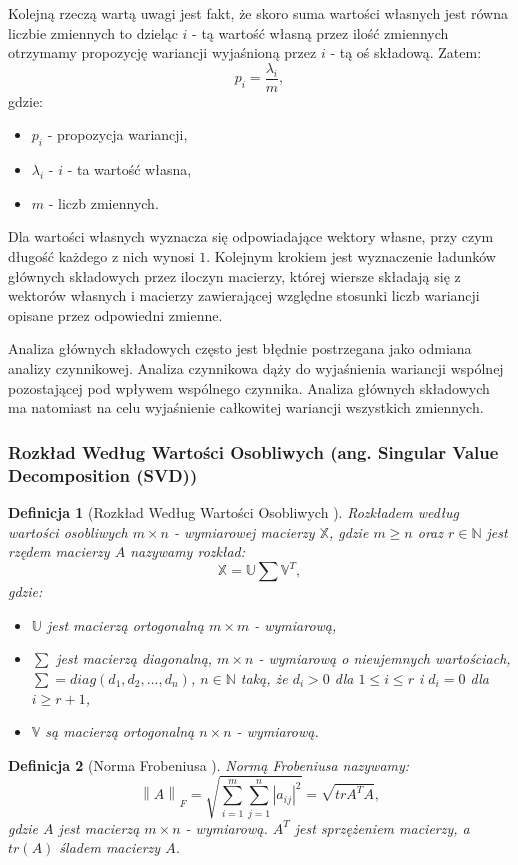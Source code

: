 \documentclass[12pt,a4paper]{report}
\newtheorem{df}{Definicja}[chapter]
\newcommand{\setN}{\mathbb{N}}
\newcommand{\norm}[2][]{\left\| {#2} \right\|_{#1}}
\begin{document}
Kolejną rzeczą wartą uwagi jest fakt, że skoro suma wartości własnych jest równa liczbie zmiennych to dzieląc $i$ - tą wartość własną przez ilość zmiennych otrzymamy propozycję wariancji wyjaśnioną przez $i$ - tą oś składową. Zatem:
$$
p_i = \frac{\lambda_i}{m},
$$
gdzie:
\begin{itemize}
\item $p_i$ - propozycja wariancji,
\item $\lambda_i$ - $i$ - ta wartość własna,
\item $m$ - liczb zmiennych.
\end{itemize}

Dla wartości własnych wyznacza się odpowiadające wektory własne, przy czym długość każdego z nich wynosi $1$. Kolejnym krokiem jest wyznaczenie ładunków głównych składowych przez iloczyn macierzy, której wiersze składają się z wektorów własnych i macierzy zawierającej względne stosunki liczb wariancji opisane przez odpowiedni zmienne.

Analiza głównych składowych często jest błędnie postrzegana jako odmiana analizy czynnikowej. Analiza czynnikowa dąży do wyjaśnienia wariancji wspólnej pozostającej pod wpływem wspólnego czynnika. Analiza głównych składowych ma natomiast na celu wyjaśnienie całkowitej wariancji wszystkich zmiennych.

\subsubsection{Rozkład Według Wartości Osobliwych (ang. Singular Value Decomposition (SVD))} 
\begin{df} [Rozkład Według Wartości Osobliwych {\citep{ulafiir}}]%
Rozkładem według wartości osobliwych $m\times n$ - wymiarowej macierzy $\mathbb{X}$, gdzie $m\geq n$ oraz $r \in \setN$ jest rzędem macierzy $A$ nazywamy rozkład:
$$
\mathbb{X}=\mathbb{U}\sum \mathbb{V}^T,
$$
gdzie:
\begin{itemize}
\item $\mathbb{U}$ jest macierzą ortogonalną $m \times m$ - wymiarową,
\item $\sum $ jest macierzą diagonalną, $m \times n$ - wymiarową o nieujemnych wartościach, $\sum = diag(d_1, d_2,..., d_n)$, $n \in \setN$ taką, że $d_i>0$ dla $1\leq i \leq r$ i $d_i=0$ dla $i\geq r+1$,
\item $\mathbb{V}$ są macierzą ortogonalną $n \times n$ - wymiarową.
\end{itemize}
\end{df}
\begin{df}[Norma Frobeniusa {\citep{ulafiir}}] %
Normą Frobeniusa nazywamy:
$$
{\norm{A}}_F = \sqrt{\sum_{i=1}^m \sum_{j=1}^n |a_{ij}|^2} = \sqrt{tr A^T A},
$$
gdzie $A$ jest macierzą $m\times n$ - wymiarową. $ A^T$ jest sprzężeniem macierzy, a $tr(A)$ śladem macierzy $A$.
\end{df}
\end{document}
